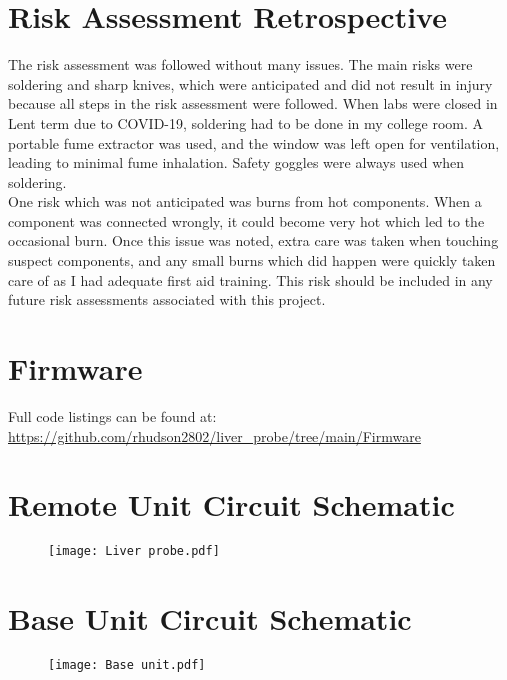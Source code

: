 \section{Risk Assessment Retrospective}
The risk assessment was followed without many issues. The main risks were soldering and sharp knives, which were anticipated and did not result in injury because all steps in the risk assessment were followed. When labs were closed in Lent term due to COVID-19, soldering had to be done in my college room. A portable fume extractor was used, and the window was left open for ventilation, leading to minimal fume inhalation. Safety goggles were always used when soldering.\\

One risk which was not anticipated was burns from hot components. When a component was connected wrongly, it could become very hot which led to the occasional burn. Once this issue was noted, extra care was taken when touching suspect components, and any small burns which did happen were quickly taken care of as I had adequate first aid training. This risk should be included in any future risk assessments associated with this project.


\section{Firmware}
Full code listings can be found at:\\
\url{https://github.com/rhudson2802/liver_probe/tree/main/Firmware}

\newpage
\singlespacing
\begin{landscape}
\section{Remote Unit Circuit Schematic}
\vspace{-5mm}
\begin{figure}[h!]
	\centering
	\texttt{[image: Liver probe.pdf]}
\end{figure}

\section{Base Unit Circuit Schematic}
\vspace{-5mm}
\begin{figure}[h!]
	\centering
	\texttt{[image: Base unit.pdf]}
\end{figure}
\end{landscape}


